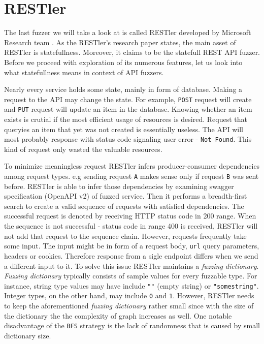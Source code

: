 \section{RESTler}
The last fuzzer we will take a look at is called RESTler developed by Microsoft Research team \cite{atlidakis2019restler}. As the RESTler's research paper states, the main asset of RESTler is statefullness. Moreover, it claims to be the statefull REST API fuzzer. Before we proceed with exploration of its numerous features, let us look into what statefullness means in context of API fuzzers.

Nearly every service holds some state, mainly in form of database. Making a request to the API may change the state. For example, \texttt{POST} request will create and \texttt{PUT} request will update an item in the database. Knowing whether an item exists is crutial if the most  efficient usage of resources is desired. Request that queryies an item that yet was not created is essentially useless. The API will most probably response with status code signaling user error - \texttt{Not Found}. This kind of request only wasted the valuable resources.

To minimize meaningless request RESTler infers producer-consumer dependencies among request types. e.g sending request \texttt{A} makes sense only if request \texttt{B} was sent before. RESTler is able to infer those dependencies by examining swagger specification (OpenAPI v2) of fuzzed service. Then it performs a breadth-first search to create a valid sequence of requests with satisfied dependencies. The successful request is denoted by receiving HTTP status code in 200 range. When the sequence is not successful - status code in range 400 is received, RESTler will not add that request to the sequence chain. However, requests frequently take some input. The input might be in form of a request body, \texttt{url} query parameters, headers or cookies. Therefore response from a sigle endpoint differs when we send a different input to it. To solve this issue RESTler maintains a \textit{fuzzing dictionary}. \textit{Fuzzing dictionary} typically consists of sample values for every fuzzable type. For instance, string type values may have include \texttt{""} (empty string) or \texttt{"somestring"}. Integer types, on the other hand, may include \texttt{0} and \texttt{1}. However, RESTler needs to keep the aforementioned \textit{fuzzing dictionary} rather small since with the size of the dictionary the the complexity of graph increases as well. One notable disadvantage of the \texttt{BFS} strategy is the lack of randomness that is caused by small dictionary size.

